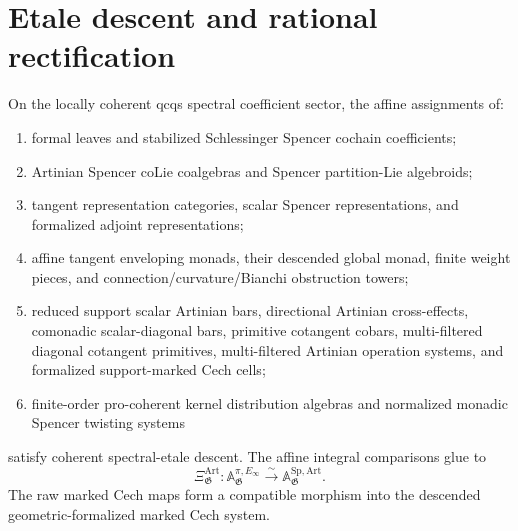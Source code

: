 \section{Etale descent and rational rectification}
\label{sec:as-descent-rectification}

\begin{theorem}
\label{thm:as-spencer-etale-descent}
On the locally coherent qcqs spectral coefficient sector, the affine
assignments of:
\begin{enumerate}
    \item formal leaves and stabilized Schlessinger Spencer cochain
    coefficients;
    \item Artinian Spencer coLie coalgebras and Spencer partition-Lie
    algebroids;
    \item tangent representation categories, scalar Spencer representations,
    and formalized adjoint representations;
    \item affine tangent enveloping monads, their descended global monad,
    finite weight pieces, and connection/curvature/Bianchi obstruction
    towers;
    \item reduced support scalar Artinian bars, directional Artinian
    cross-effects, comonadic scalar-diagonal bars, primitive cotangent cobars,
    multi-filtered diagonal cotangent primitives, multi-filtered Artinian
    operation systems, and formalized support-marked Cech cells;
    \item finite-order pro-coherent kernel distribution algebras and normalized
    monadic Spencer twisting systems
\end{enumerate}
satisfy coherent spectral-etale descent.  The affine integral comparisons
glue to
\[
    \Xi_{\mathfrak G}^{\mathrm{Art}}:
    \mathbb A_{\mathfrak G}^{\pi,E_\infty}
    \xrightarrow{\sim}
    \mathbb A_{\mathfrak G}^{\mathrm{Sp,Art}}.
\]
The raw marked Cech maps form a compatible morphism into the descended
geometric-formalized marked Cech system.
\end{theorem}

